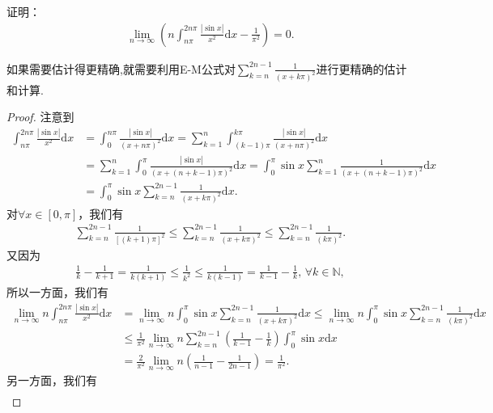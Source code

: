 \documentclass[../../main.tex]{subfiles}%
\begin{document}
\begin{example}
证明：
\begin{align*}
\lim_{n \to \infty} \left( n \int_{n\pi}^{2n\pi} \frac{|\sin x|}{x^2} \mathrm{d}x - \frac{1}{\pi^2} \right) = 0.
\end{align*}
\end{example}
\begin{note}
如果需要估计得更精确,就需要利用E-M公式对$\sum_{k=n}^{2n - 1} \frac{1}{(x + k\pi)^2}$进行更精确的估计和计算.
\end{note}
\begin{proof}
注意到
\begin{align*}
\int_{n\pi}^{2n\pi} \frac{|\sin x|}{x^2} \mathrm{d}x &= \int_0^{n\pi} \frac{|\sin x|}{(x + n\pi)^2} \mathrm{d}x = \sum_{k=1}^n \int_{(k-1)\pi}^{k\pi} \frac{|\sin x|}{(x + n\pi)^2} \mathrm{d}x \\
&= \sum_{k=1}^n \int_0^{\pi} \frac{|\sin x|}{(x + (n + k - 1)\pi)^2} \mathrm{d}x = \int_0^{\pi} \sin x \sum_{k=1}^n \frac{1}{(x + (n + k - 1)\pi)^2} \mathrm{d}x \\
&= \int_0^{\pi} \sin x \sum_{k=n}^{2n - 1} \frac{1}{(x + k\pi)^2} \mathrm{d}x.
\end{align*}
对$\forall x \in [0, \pi]$，我们有
\begin{align*}
\sum_{k=n}^{2n - 1} \frac{1}{[(k + 1)\pi]^2} \leqslant  \sum_{k=n}^{2n - 1} \frac{1}{(x + k\pi)^2} \leqslant  \sum_{k=n}^{2n - 1} \frac{1}{(k\pi)^2}.
\end{align*}
又因为
\begin{align*}
\frac{1}{k} - \frac{1}{k + 1} = \frac{1}{k(k + 1)} \leqslant  \frac{1}{k^2} \leqslant  \frac{1}{k(k - 1)} = \frac{1}{k - 1} - \frac{1}{k}, \, \forall k \in \mathbb{N},
\end{align*}
所以一方面，我们有
\begin{align*}
\lim_{n \to \infty} n \int_{n\pi}^{2n\pi} \frac{|\sin x|}{x^2} \mathrm{d}x &= \lim_{n \to \infty} n \int_0^{\pi} \sin x \sum_{k=n}^{2n - 1} \frac{1}{(x + k\pi)^2} \mathrm{d}x \leqslant  \lim_{n \to \infty} n \int_0^{\pi} \sin x \sum_{k=n}^{2n - 1} \frac{1}{(k\pi)^2} \mathrm{d}x \\
&\leqslant  \frac{1}{\pi^2} \lim_{n \to \infty} n \sum_{k=n}^{2n - 1} \left( \frac{1}{k - 1} - \frac{1}{k} \right) \int_0^{\pi} \sin x \mathrm{d}x \\
&= \frac{2}{\pi^2} \lim_{n \to \infty} n \left( \frac{1}{n - 1} - \frac{1}{2n - 1} \right) = \frac{1}{\pi^2}.
\end{align*}
另一方面，我们有
\begin{align*}

\end{align*}
\end{proof}
\end{document}
